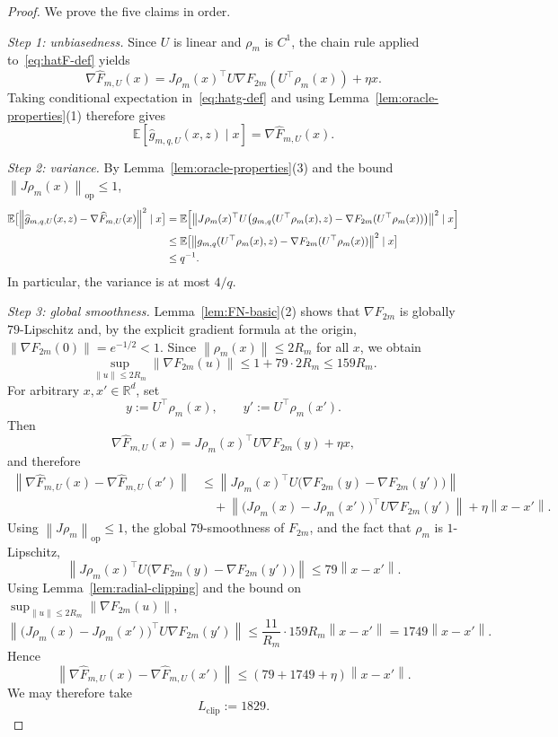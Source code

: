 \documentclass[11pt]{article}
\newcommand{\R}{\mathbb{R}}
\newcommand{\E}{\mathbb{E}}
\newcommand{\norm}[1]{\left\lVert #1\right\rVert}
\begin{document}
\begin{proof}
We prove the five claims in order.

\emph{Step 1: unbiasedness.}
Since $U$ is linear and $\rho_m$ is $C^1$, the chain rule applied to~\eqref{eq:hatF-def} yields
\[
\nabla \widehat F_{m,U}(x)=J\rho_m(x)^\top U\nabla F_{2m}(U^\top \rho_m(x))+\eta x.
\]
Taking conditional expectation in~\eqref{eq:hatg-def} and using Lemma~\ref{lem:oracle-properties}(1) therefore gives
\[
\E[\widehat g_{m,q,U}(x,z)\mid x]=\nabla \widehat F_{m,U}(x).
\]

\emph{Step 2: variance.}
By Lemma~\ref{lem:oracle-properties}(3) and the bound $\norm{J\rho_m(x)}_{\mathrm{op}}\le 1$,
\[
\begin{aligned}
\E\bigl[\norm{\widehat g_{m,q,U}(x,z)-\nabla \widehat F_{m,U}(x)}^2\mid x\bigr]
&=
\E\Bigl[\norm{J\rho_m(x)^\top U\bigl(g_{m,q}(U^\top \rho_m(x),z)-\nabla F_{2m}(U^\top \rho_m(x))\bigr)}^2\mid x\Bigr]\\
&\le
\E\bigl[\norm{g_{m,q}(U^\top \rho_m(x),z)-\nabla F_{2m}(U^\top \rho_m(x))}^2\mid x\bigr]\\
&\le
q^{-1}.
\end{aligned}
\]
In particular, the variance is at most $4/q$.

\emph{Step 3: global smoothness.}
Lemma~\ref{lem:FN-basic}(2) shows that $\nabla F_{2m}$ is globally $79$-Lipschitz and, by the explicit gradient formula at the origin, $\norm{\nabla F_{2m}(0)}=e^{-1/2}<1$.
Since $\norm{\rho_m(x)}\le 2R_m$ for all $x$, we obtain
\[
\sup_{\norm{u}\le 2R_m}\norm{\nabla F_{2m}(u)}\le 1+79\cdot 2R_m\le 159R_m.
\]
For arbitrary $x,x'\in\R^d$, set
\[
y:=U^\top \rho_m(x),
\qquad
y':=U^\top \rho_m(x').
\]
Then
\[
\nabla \widehat F_{m,U}(x)=J\rho_m(x)^\top U\nabla F_{2m}(y)+\eta x,
\]
and therefore
\[
\begin{aligned}
\norm{\nabla \widehat F_{m,U}(x)-\nabla \widehat F_{m,U}(x')}
&\le
\norm{J\rho_m(x)^\top U\bigl(\nabla F_{2m}(y)-\nabla F_{2m}(y')\bigr)}\\
&\quad
+\norm{\bigl(J\rho_m(x)-J\rho_m(x')\bigr)^\top U\nabla F_{2m}(y')}
+\eta \norm{x-x'}.
\end{aligned}
\]
Using $\norm{J\rho_m}_{\mathrm{op}}\le 1$, the global $79$-smoothness of $F_{2m}$, and the fact that $\rho_m$ is $1$-Lipschitz,
\[
\norm{J\rho_m(x)^\top U\bigl(\nabla F_{2m}(y)-\nabla F_{2m}(y')\bigr)}
\le
79\norm{x-x'}.
\]
Using Lemma~\ref{lem:radial-clipping} and the bound on $\sup_{\norm{u}\le 2R_m}\norm{\nabla F_{2m}(u)}$,
\[
\norm{\bigl(J\rho_m(x)-J\rho_m(x')\bigr)^\top U\nabla F_{2m}(y')}
\le
\frac{11}{R_m}\cdot 159R_m\norm{x-x'}
=
1749\norm{x-x'}.
\]
Hence
\[
\norm{\nabla \widehat F_{m,U}(x)-\nabla \widehat F_{m,U}(x')}
\le
(79+1749+\eta)\norm{x-x'}.
\]
We may therefore take
\[
L_{\mathrm{clip}}:=1829.
\]


\end{proof}
\end{document}
